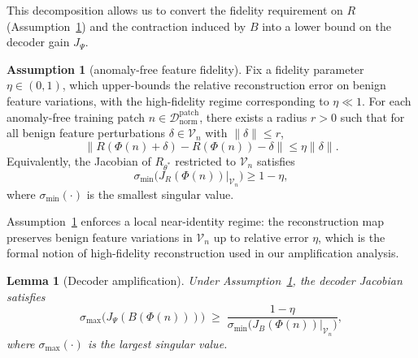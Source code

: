 \documentclass{article}
\theoremstyle{plain}
\newtheorem{lemma}[theorem]{Lemma}
\theoremstyle{definition}
\newtheorem{assumption}[theorem]{Assumption}
\theoremstyle{remark}
\begin{document}
This decomposition allows us to convert the fidelity requirement on $R$
(Assumption~\ref{ass:fidelity}) and the contraction induced by $B$
into a lower bound on the decoder gain $J_\Psi$.





\begin{assumption}[anomaly-free feature fidelity]
\label{ass:fidelity}
Fix a fidelity parameter $\eta \in (0,1)$, which upper-bounds the relative reconstruction error on benign feature variations, with the high-fidelity regime corresponding to $\eta \ll 1$.
For each anomaly-free training patch $n \in \mathcal{D}_{\mathrm{norm}}^{\mathrm{patch}}$, there exists a radius $r>0$ such that for all benign feature perturbations $\delta \in \mathcal{V}_n$ with $\|\delta\|\le r$,
\begin{equation}
    \big\| R(\Phi(n)+\delta) - R(\Phi(n)) - \delta \big\| \le \eta \|\delta\|.
\end{equation}
Equivalently, the Jacobian of $R_{\theta^*}$ restricted to $\mathcal{V}_n$ satisfies
\begin{equation}
    \sigma_{\min}\big(J_{R}(\Phi(n))\big|_{\mathcal{V}_n}\big) \ge 1 - \eta,
\end{equation}
where $\sigma_{\min}(\cdot)$ is the smallest singular value.
\end{assumption}


Assumption~\ref{ass:fidelity} enforces a local near-identity regime: the reconstruction map preserves benign feature variations in $\mathcal{V}_n$ up to relative error $\eta$, which is the formal notion of high-fidelity reconstruction used in our amplification analysis.


\begin{lemma}[Decoder amplification]
\label{lem:amplification}
Under Assumption~\ref{ass:fidelity}, the decoder Jacobian satisfies
\begin{equation}
    \sigma_{\max}\big(J_\Psi(B(\Phi(n)))\big)
    \;\ge\;
    \frac{1-\eta}{
    \sigma_{\min}\big(J_B(\Phi(n))\big|_{\mathcal{V}_n}\big)},
\end{equation}
where $\sigma_{\max}(\cdot)$ is the largest singular value.
\end{lemma}
\end{document}
